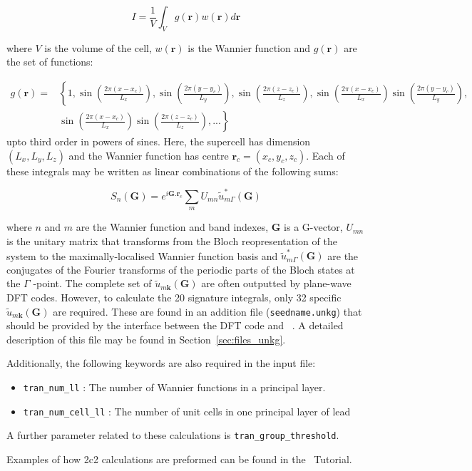 \begin{equation}
I=\frac{1}{V}\int_V g(\mathbf{r})w(\mathbf{r})d\mathbf{r}
\label{eq:sig_ints}
\end{equation}

where $V$ is the volume of the cell, $w(\mathbf{r})$ is the Wannier 
function and $g(\mathbf{r})$ are the set of functions:

\begin{eqnarray}
g(\mathbf{r})=&\left\lbrace1,\sin\left(\frac{2\pi (x-x_c)}{L_x}\right),
											 \sin\left(\frac{2\pi (y-y_c)}{L_y}\right),
											 \sin\left(\frac{2\pi (z-z_c)}{L_z}\right),
											 \sin\left(\frac{2\pi (x-x_c)}{L_x}\right)
											 \sin\left(\frac{2\pi (y-y_c)}{L_y}\right),\right.\nonumber \\
										   &\left.\sin\left(\frac{2\pi (x-x_c)}{L_x}\right)
											 \sin\left(\frac{2\pi (z-z_c)}{L_z}\right),
											 ... \right\rbrace
\label{eq:g(r)}
\end{eqnarray}
upto third order in powers of sines. Here, the supercell has dimension 
$(L_x,L_y,L_z)$ and the Wannier function has centre $\mathbf{r}_c=(x_c,y_c,z_c)$.
Each of these integrals may be written as linear combinations 
of the following sums:

\begin{equation}
S_n(\mathbf{G})=\displaystyle{e^{i\mathbf{G.r}_{c}}\sum_{m}U_{mn}\tilde{u}_{m\Gamma}^{*}(\mathbf{G})}
\end{equation}

where $n$ and $m$ are the Wannier function and band indexes, 
$\mathbf{G}$ is a G-vector, $U_{mn}$ is the unitary matrix that 
transforms from the Bloch reopresentation of the system to the 
maximally-localised Wannier function basis and 
$\tilde{u}_{m\Gamma}^{*}(\mathbf{G})$ are the conjugates of the 
Fourier transforms of the periodic parts of the Bloch states at the $\Gamma\!$
-point. The complete set of $\tilde{u}_{m\mathbf{k}}(\mathbf{G})$ 
are often outputted by plane-wave DFT codes. However, to calculate the 20 
signature integrals, only 32 specific $\tilde{u}_{m\mathbf{k}}(\mathbf{G})$ 
are required. These are found in an addition file (\verb#seedname.unkg#) 
that should be provided by the interface between the DFT code and \wannier\ . 
A detailed description of this file may be found in Section~\ref{sec:files_unkg}.

Additionally, the following keywords are also required in the input file:
\begin{itemize}
\item \verb#tran_num_ll# : The number of Wannier functions in a 
principal layer.
\item \verb#tran_num_cell_ll# : The number of unit cells in one 
principal layer of lead
\end{itemize}

A further parameter related to these calculations is
\verb#tran_group_threshold#.

Examples of how 2c2 calculations are preformed can be found 
in the \wannier\ Tutorial. 

